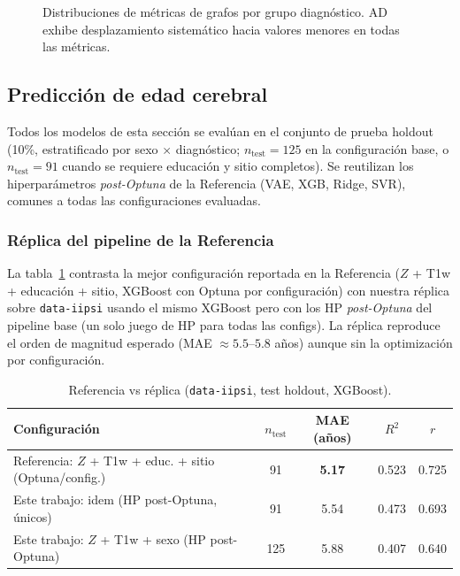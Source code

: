 \documentclass[12pt,a4paper]{article}
\begin{document}
\begin{figure}[H]
  \centering
  \caption{Distribuciones de métricas de grafos por grupo diagnóstico. AD exhibe
  desplazamiento sistemático hacia valores menores en todas las métricas.}
  \label{fig:grafos_violins}
\end{figure}

\subsection{Predicción de edad cerebral}

Todos los modelos de esta sección se evalúan en el conjunto de prueba holdout (10\%,
estratificado por sexo $\times$ diagnóstico; $n_{\text{test}} = 125$ en la configuración base, o
$n_{\text{test}} = 91$ cuando se requiere educación y sitio completos). Se reutilizan los
hiperparámetros \emph{post-Optuna} de la Referencia (VAE, XGB, Ridge, SVR), comunes a todas las
configuraciones evaluadas.

\subsubsection{Réplica del pipeline de la Referencia}

La tabla~\ref{tab:ref_tesis} contrasta la mejor configuración reportada en la Referencia
($Z$ + T1w + educación + sitio, XGBoost con Optuna por configuración) con nuestra réplica sobre
\texttt{data-iipsi} usando el mismo XGBoost pero con los HP \emph{post-Optuna} del pipeline base
(un solo juego de HP para todas las configs). La réplica reproduce el orden de magnitud
esperado (MAE $\approx 5.5$--$5.8$ años) aunque sin la optimización por configuración.

\begin{table}[H]
  \centering
  \caption{Referencia vs réplica (\texttt{data-iipsi}, test holdout, XGBoost).}
  \label{tab:ref_tesis}
  \begin{tabular}{lcccc}
    \toprule
    Configuración & $n_{\text{test}}$ & MAE (años) & $R^2$ & $r$ \\
    \midrule
    Referencia: $Z$ + T1w + educ. + sitio (Optuna/config.) & 91 & \textbf{5.17} & 0.523 & 0.725 \\
    Este trabajo: idem (HP post-Optuna, únicos) & 91 & 5.54 & 0.473 & 0.693 \\
    Este trabajo: $Z$ + T1w + sexo (HP post-Optuna) & 125 & 5.88 & 0.407 & 0.640 \\
    \bottomrule
  \end{tabular}
\end{table}
\end{document}
